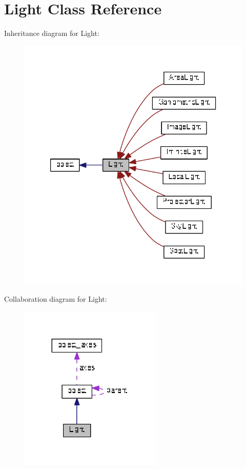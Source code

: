 \hypertarget{classLight}{}\section{Light Class Reference}
\label{classLight}


Inheritance diagram for Light\+:\nopagebreak
\begin{figure}[H]
\begin{center}
\leavevmode
\includegraphics[width=333pt]{classLight__inherit__graph}
\end{center}
\end{figure}


Collaboration diagram for Light\+:\nopagebreak
\begin{figure}[H]
\begin{center}
\leavevmode
\includegraphics[width=191pt]{classLight__coll__graph}
\end{center}
\end{figure}
